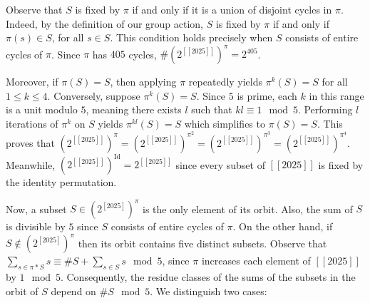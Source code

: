 \documentclass[a4paper,11pt]{article}
\numberwithin{equation}{section}
\def\llbracket{[\![}
\def\rrbracket{]\!]}
\begin{document}
    Observe that $S$ is fixed by $\pi$ if and only if it is a union of disjoint cycles in $\pi$. Indeed, by the definition of our group action, $S$ is fixed by $\pi$ if and only if $\pi(s) \in S$, for all $s\in S$. This condition holds precisely when $S$ consists of entire cycles of $\pi$. Since $\pi$ has $405$ cycles, $\# (2^{\llbracket 2025 \rrbracket})^{\pi} = 2^{405}$. \medskip
    
    Moreover, if $\pi(S)=S$, then applying $\pi$ repeatedly yields $\pi^{k}(S)=S$ for all $1 \leq k\leq 4$. Conversely, suppose $\pi^{k}(S)=S$. Since $5$ is prime, each $k$ in this range is a unit modulo $5$, meaning there exists $l$ such that $kl \equiv 1 \mod{5}$. Performing $l$ iterations of $\pi^{k}$ on $S$ yields $\pi^{kl}(S)=S$ which simplifies to $\pi(S)=S$. This proves that $(2^{\llbracket 2025 \rrbracket})^{\pi} = (2^{\llbracket 2025 \rrbracket})^{\pi^{2}}=(2^{\llbracket 2025 \rrbracket})^{\pi^{3}}=(2^{\llbracket 2025 \rrbracket})^{\pi^{4}}$. Meanwhile, $(2^{\llbracket 2025 \rrbracket})^{\text{Id}}=2^{\llbracket 2025 \rrbracket}$ since every subset of \( \llbracket 2025 \rrbracket \) is fixed by the identity permutation. \smallskip

    Now, a subset $S \in (2^{[2025]})^\pi$ is the only element of its orbit. Also, the sum of $S$ is divisible by $5$ since $S$ consists of entire cycles of $\pi$. On the other hand, if $S \not \in (2^{[2025]})^\pi$  then its orbit contains five distinct subsets. Observe that $\sum_{s\in \pi*S}s \equiv \# S + \sum_{s\in S} s\mod 5$, since $\pi$ increases each element of $\llbracket 2025 \rrbracket$ by $1 \mod{5}$. Consequently, the residue classes of the sums of the subsets in the orbit of $S$ depend on $\#S\mod 5$. We distinguish two cases:
\end{document}
